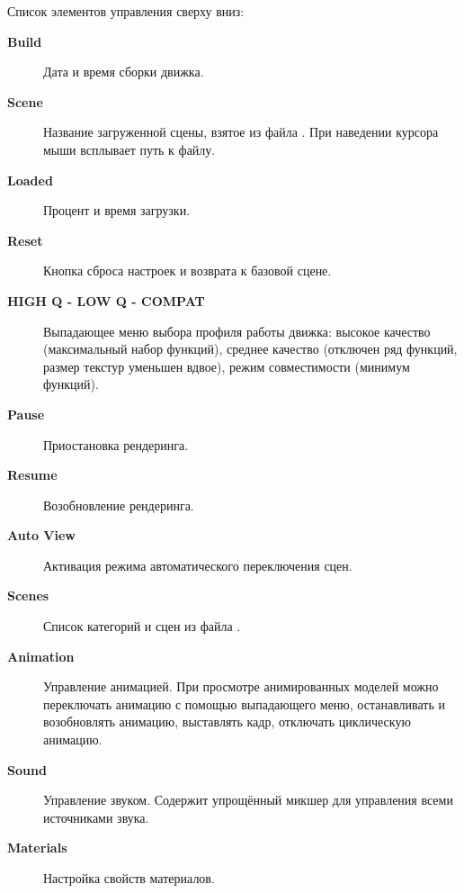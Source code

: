 \documentclass[a4paper,12pt,oneside]{sphinxmanual}
\begin{document}
\begin{DUlineblock}{0em}
\item[] 
\end{DUlineblock}

Список элементов управления сверху вниз:
\begin{description}
\item[{\textbf{Build}}] \leavevmode
Дата и время сборки движка.

\item[{\textbf{Scene}}] \leavevmode
Название загруженной сцены, взятое из файла . При наведении курсора мыши всплывает путь к файлу.

\item[{\textbf{Loaded}}] \leavevmode
Процент и время загрузки.

\item[{\textbf{Reset}}] \leavevmode
Кнопка сброса настроек и возврата к базовой сцене.

\item[{\textbf{HIGH Q - LOW Q - COMPAT}}] \leavevmode
Выпадающее меню выбора профиля работы движка: высокое качество (максимальный набор функций), среднее качество (отключен ряд функций, размер текстур уменьшен вдвое), режим совместимости (минимум функций).

\item[{\textbf{Pause}}] \leavevmode
Приостановка рендеринга.

\item[{\textbf{Resume}}] \leavevmode
Возобновление рендеринга.

\item[{\textbf{Auto View}}] \leavevmode
Активация режима автоматического переключения сцен.

\item[{\textbf{Scenes}}] \leavevmode
Список категорий и сцен из файла .

\item[{\textbf{Animation}}] \leavevmode
Управление анимацией. При просмотре анимированных моделей можно переключать анимацию с помощью выпадающего меню, останавливать и возобновлять анимацию, выставлять кадр, отключать циклическую анимацию.

\item[{\textbf{Sound}}] \leavevmode
Управление звуком. Содержит упрощённый микшер для управления всеми источниками звука.

\item[{\textbf{Materials}}] \leavevmode
Настройка свойств материалов.


\end{description}
\end{document}
